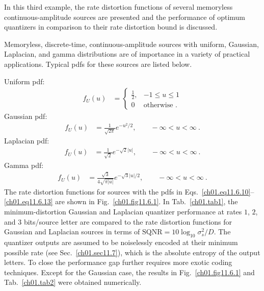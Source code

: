 In this third example, the rate distortion functions of several
memoryless continuous-amplitude sources are presented and the
performance of optimum quantizers in comparison to their rate
distortion bound is discussed.

\begin{example}
\label{ch01.ex11.6.3}
Memoryless, discrete-time, continuous-amplitude sources with
uniform, Gaussian, Laplacian, and gamma distributions are of
importance in a variety of practical applications.
Typical pdfs for these sources are listed below.

\vspace{0.1in}
{\noindent Uniform pdf:}
\begin{align}
        f_U(u) & =
        \begin{cases}
        \tfrac{1}{2},    & -1 \leq u \leq 1      \\
        0                & \text{otherwise~.}
        \end{cases}
\label{ch01.eq11.6.10}                  %
\end{align}
{Gaussian pdf:}                         %
\begin{align}
        f_U(u) & =
           \frac{1}{\sqrt{2 \pi} } e^{-u^2/2},
               \qquad  -\infty < u < \infty~.
\label{ch01.eq11.6.11}                          %
\end{align}
{Laplacian pdf:}        %
\begin{align}
        f_U(u) & =
           \frac{1}{ \sqrt{2} } e^{ - \sqrt{2}|u| },
               \qquad  -\infty < u < \infty~.
\label{ch01.eq11.6.12}                          %
\end{align}
{Gamma pdf:}            %
\begin{align}
        f_U(u) & =
           \frac{\sqrt{3} }{ 4 \sqrt{ \pi |u| } }
              e^{- \sqrt{3}  |u|/2},
               \qquad  -\infty < u < \infty~.
\label{ch01.eq11.6.13}
\end{align}
The rate distortion functions for sources with the pdfs in
Eqs.~\eqref{ch01.eq11.6.10}--\eqref{ch01.eq11.6.13} are shown in
Fig.~\ref{ch01.fig11.6.1}.
In Tab.~\ref{ch01.tab1}, the minimum-distortion
Gaussian and Laplacian quantizer performance at rates
$1$, $2$, and $3$ bits/source letter are compared to the rate
distortion functions for Gaussian and Laplacian sources
in terms of $\text{SQNR} = 10 \log_{10} \sigma_s^2 /D$.
The quantizer outputs are assumed to be noiselessly
encoded at their minimum possible rate (see Sec.~\ref{ch01.sec11.7}),
which is the absolute entropy of the output letters.
To close the performance gap further requires more
exotic coding techniques.
Except for the Gaussian case, the results in Fig.~\ref{ch01.fig11.6.1}
and Tab.~\ref{ch01.tab2} were obtained numerically.
\end{example}

